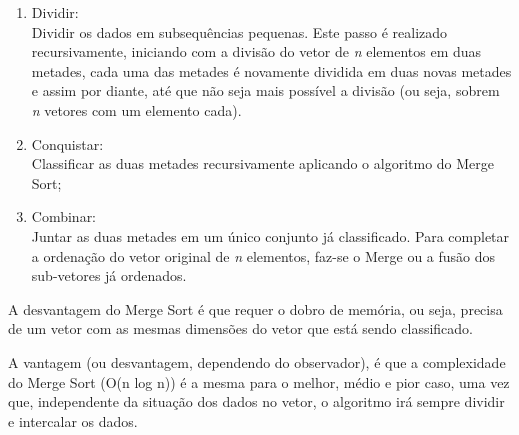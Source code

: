 		\begin{enumerate}
			\item Dividir:\\
				Dividir os dados em subsequências pequenas. Este passo é realizado recursivamente, iniciando com a divisão do vetor de \textit{n} elementos em duas metades, cada uma das metades é novamente dividida em duas novas metades e assim por diante, até que não seja mais possível a divisão (ou seja, sobrem \textit{n} vetores com um elemento cada).
				
			\item Conquistar:\\
				Classificar as duas metades recursivamente aplicando o algoritmo do Merge Sort;
			
			\item Combinar:\\
				Juntar as duas metades em um único conjunto já classificado. Para completar a ordenação do vetor original de \textit{n} elementos, faz-se o Merge ou a fusão dos sub-vetores já ordenados.
		\end{enumerate}
		
		A desvantagem do Merge Sort é que requer o dobro de memória, ou seja, precisa de um vetor com as mesmas dimensões do vetor que está sendo classificado.
		
		A vantagem (ou desvantagem, dependendo do observador), é que a complexidade do Merge Sort (O(n log n)) é a mesma para o melhor, médio e pior caso, uma vez que, independente da situação dos dados no vetor, o algoritmo irá sempre dividir e intercalar os dados.